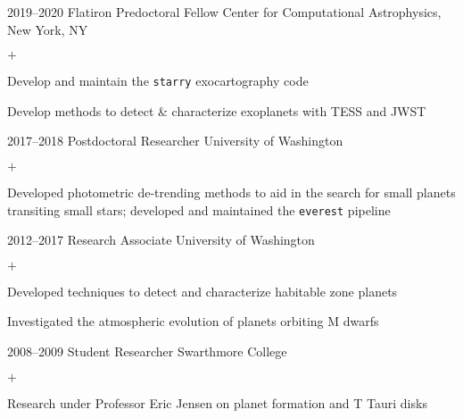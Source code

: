 \documentclass[]{luger-cv} %
\begin{document}
\begin{entrylist}


\entry
{2019--2020}
{Flatiron Predoctoral Fellow}
{Center for Computational Astrophysics, New York, NY}
{%
\vspace{-1em}
\begin{list}{$+$}{\cvlist}
\item Develop and maintain the \texttt{starry} exocartography code
\item Develop methods to detect \& characterize exoplanets with TESS and JWST
\end{list}
}


\entry
{2017--2018}
{Postdoctoral Researcher}
{University of Washington}
{%
\vspace{-1em}
\begin{list}{$+$}{\cvlist}
\item Developed photometric de-trending methods to aid in the search for small
      planets transiting small stars; developed and maintained the \texttt{everest} pipeline
\end{list}
}


\entry
{2012--2017}
{Research Associate}
{University of Washington}
{%
\vspace{-1em}
\begin{list}{$+$}{\cvlist}
\item Developed techniques to detect and characterize habitable
zone planets
\item Investigated the atmospheric evolution of planets orbiting M dwarfs
\end{list}
}


\ifdefined \onepage \else
\entry
{2008--2009}
{Student Researcher}
{Swarthmore College}
{%
\vspace{-1em}
\begin{list}{$+$}{\cvlist}
\item Research under Professor Eric Jensen on planet formation and T Tauri disks
\end{list}
}
\fi


\end{entrylist}
\end{document}

